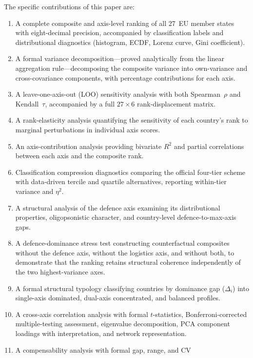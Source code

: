 The specific contributions of this paper are:

\begin{enumerate}[leftmargin=2em]
  \item A complete composite and axis-level ranking of all 27~EU
    member states with eight-decimal precision, accompanied by
    classification labels and distributional diagnostics (histogram,
    ECDF, Lorenz curve, Gini coefficient).
  \item A formal variance decomposition---proved analytically from the
    linear aggregation rule---decomposing the composite variance into
    own-variance and cross-covariance components, with percentage
    contributions for each axis.
  \item A leave-one-axis-out (LOO) sensitivity analysis with both
    Spearman~$\rho$ and Kendall~$\tau$, accompanied by a full $27
    \times 6$ rank-displacement matrix.
  \item A rank-elasticity analysis quantifying the sensitivity of each
    country's rank to marginal perturbations in individual axis scores.
  \item An axis-contribution analysis providing bivariate $R^2$ and
    partial correlations between each axis and the composite rank.
  \item Classification compression diagnostics comparing the
    official four-tier scheme with data-driven tercile and quartile
    alternatives, reporting within-tier variance and $\eta^2$.
  \item A structural analysis of the defence axis examining its
    distributional properties, oligopsonistic character, and
    country-level defence-to-max-axis gaps.
  \item A defence-dominance stress test constructing counterfactual
    composites without the defence axis, without the logistics axis,
    and without both, to demonstrate that the ranking retains
    structural coherence independently of the two highest-variance
    axes.
  \item A formal structural typology classifying countries by
    dominance gap ($\Delta_i$) into single-axis dominated, dual-axis
    concentrated, and balanced profiles.
  \item A cross-axis correlation analysis with formal $t$-statistics,
    Bonferroni-corrected multiple-testing assessment,
    eigenvalue decomposition, PCA component loadings with
    interpretation, and network representation.
  \item A compensability analysis with formal gap, range, and CV

\end{enumerate}
